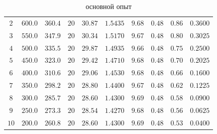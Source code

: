 \documentclass[12pt]{article}
\begin{document}
\begin{enumerate}[label={\textbf{\arabic*.}}]
\begin{table}[h]
\begin{tabular}{|c|c|c|c|c|c|c|c|c|c|}
				$2$	 & $600.0$ & $360.4$ & $20$ & $30.87$ & $1.5435$ & $9.68$ & $0.48$ & $0.86$ & $0.3600$ \\
				$3$	 & $550.0$ & $347.9$ & $20$ & $30.34$ & $1.5170$ & $9.67$ & $0.48$ & $0.80$ & $0.3025$ \\
				$4$	 & $500.0$ & $335.5$ & $20$ & $29.87$ & $1.4935$ & $9.66$ & $0.48$ & $0.75$ & $0.2500$ \\
				$5$	 & $450.0$ & $323.0$ & $20$ & $29.42$ & $1.4710$ & $9.68$ & $0.48$ & $0.70$ & $0.2025$ \\
				$6$	 & $400.0$ & $310.6$ & $20$ & $29.06$ & $1.4530$ & $9.68$ & $0.48$ & $0.66$ & $0.1600$ \\
				$7$	 & $350.0$ & $298.2$ & $20$ & $28.80$ & $1.4400$ & $9.67$ & $0.48$ & $0.62$ & $0.1225$ \\
				$8$	 & $300.0$ & $285.7$ & $20$ & $28.60$ & $1.4300$ & $9.69$ & $0.48$ & $0.58$ & $0.0900$ \\
				$9$	 & $250.0$ & $273.3$ & $20$ & $28.54$ & $1.4270$ & $9.68$ & $0.48$ & $0.56$ & $0.0625$ \\
				$10$ & $200.0$ & $260.8$ & $20$ & $28.60$ & $1.4300$ & $9.69$ & $0.48$ & $0.53$ & $0.0400$ \\ \hline
			\end{tabular}
			\caption{основной опыт}
			\label{ex}
		\end{table}
	

\end{enumerate}
\end{document}
